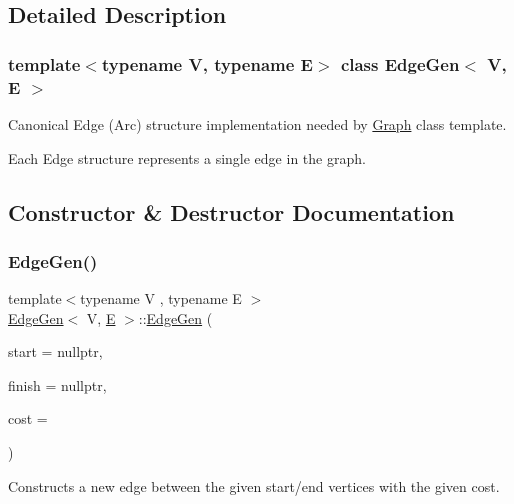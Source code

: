 \subsection{Detailed Description}
\subsubsection*{template$<$typename V, typename E$>$\newline
class Edge\+Gen$<$ V, E $>$}

Canonical Edge (Arc) structure implementation needed by \mbox{\hyperlink{classGraph}{Graph}} class template. 

Each Edge structure represents a single edge in the graph. 

\subsection{Constructor \& Destructor Documentation}
\mbox{\label{classEdgeGen_ae5c19ab1e12270d728be0cea54ce0cee}} 
\subsubsection{\texorpdfstring{Edge\+Gen()}{EdgeGen()}}
{\footnotesize\ttfamily template$<$typename V , typename E $>$ \\
\mbox{\hyperlink{classEdgeGen}{Edge\+Gen}}$<$ V, \mbox{\hyperlink{gmath_8h_ab587ba72a9c23f238cb4fd70e2fdb545}{E}} $>$\+::\mbox{\hyperlink{classEdgeGen}{Edge\+Gen}} (\begin{DoxyParamCaption}\item[{\mbox{\hyperlink{classVertexGen}{Vertex\+Gen}}$<$ V, \mbox{\hyperlink{gmath_8h_ab587ba72a9c23f238cb4fd70e2fdb545}{E}} $>$ $\ast$}]{start = {\ttfamily nullptr},  }\item[{\mbox{\hyperlink{classVertexGen}{Vertex\+Gen}}$<$ V, \mbox{\hyperlink{gmath_8h_ab587ba72a9c23f238cb4fd70e2fdb545}{E}} $>$ $\ast$}]{finish = {\ttfamily nullptr},  }\item[{double}]{cost = {} }\end{DoxyParamCaption})}



Constructs a new edge between the given start/end vertices with the given cost. 

\mbox{\label{classEdgeGen_aba5698da01314eb1362d7a594e411347}} 
